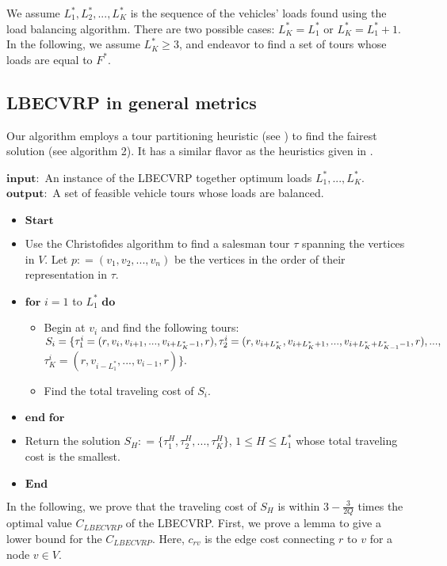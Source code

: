 \indent  We assume $L_1^*, L_2^*, ..., L_K^*$  is the sequence of the vehicles' loads found using the load balancing algorithm. There are two possible cases: $L_K^*=L_1^*$ or $L_K^*=L_1^*+1$. In the following, we assume $L_K^* \ge 3$, and endeavor to find a set of tours whose loads are equal to $F^*$. 
\subsection{LBECVRP in general metrics}
\noindent Our algorithm employs a tour partitioning heuristic (see \cite{Beasley}) to find the fairest solution (see algorithm 2). It has a similar flavor as the heuristics given in \cite{Altinkemer1990,Altinkemer1987,Haimovich1985}.  \\

\begin{algorithm}
\caption {} 
$\mathbf{input:}$ An instance of the LBECVRP together optimum loads $L_1^*,...,L_K^*$.\\
$\mathbf{output:}$ A set of feasible vehicle tours whose loads are balanced.
\begin{itemize}
\item[] $\mathbf{Start}$
\item[] Use the Christofides algorithm \cite{Christofides} to find a salesman tour $\tau$  spanning the vertices in $V$.  Let $p: = ({v_1},{v_2},...,{v_n})$ be the vertices in the order of their representation in $\tau$. 
\item[] $\mathbf{for}$ $i= 1$ to $ L_1^*$ $\mathbf{do}$
\begin{itemize}
\item[] Begin at $v_i$ and find the following tours:\\
 $S_i=\{\tau _1^i = (r,{v_i},{v_{i+1}},...,{v_{i+L_K^*-1}},r), \tau _2^i = (r,{v_{i+L_K^* }},{v_{i+L_K^* + 1}},...,{v_{i+L_K^* + L_{K - 1}^*-1}},r),...,\\$ $\tau _K^i = (r,{v_{i-L_1^*}},...,{v_{i-1}},r)\}$. 
\item[] Find the total traveling cost of $S_i$.
\end{itemize}
\item[] $\mathbf{end\,\, for}$
\item[]  Return the solution ${S_H}: = \{ \tau _1^H,\tau _2^H,...,\tau _K^H\} $,  $1 \le H \le L_1^*$ whose total traveling cost is the smallest. 
\item[] $\mathbf{End}$
\end{itemize}
\end{algorithm}
\indent In the following, we prove that the traveling cost of $S_H$ is within $3-\frac{3}{2Q}$ times the optimal value $C_{LBECVRP}$ of the LBECVRP. First, we prove a lemma to give a lower bound for the $C_{LBECVRP}$. Here, $c_{rv}$ is the edge cost connecting $r$ to $v$ for a node $v \in V$.
